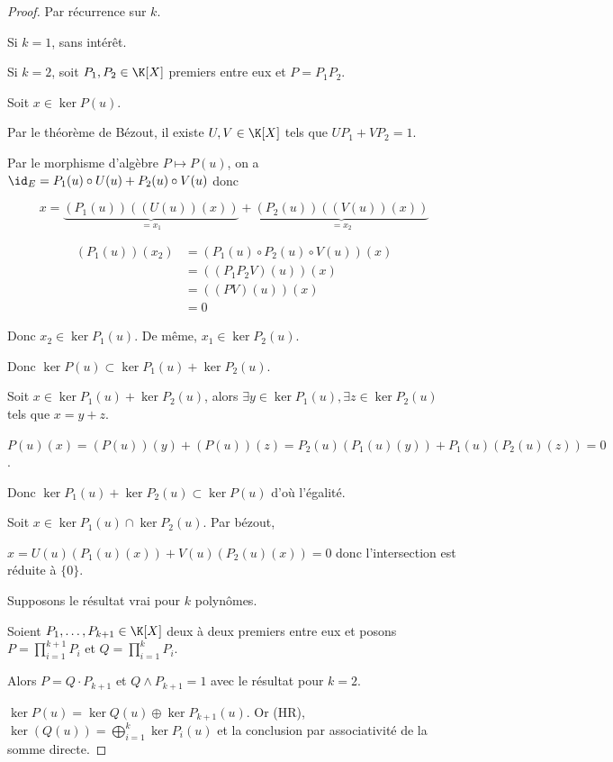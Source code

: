 
\begin{proof}
    Par récurrence sur $k$. 

    Si $k = 1$, sans intérêt. 

    Si $k = 2$, soit $P_1, P_2 \in \K[X]$ premiers entre eux et $P = P_1 P_2$.

    Soit $x \in \ker P(u)$. 

    Par le théorème de Bézout, il existe $U, V \in \K[X]$ tels que $U P_1 + V P_2 = 1$.

    Par le morphisme d'algèbre $P \mapsto P(u)$, on a 
    $\id_E = P_1(u) \circ U(u) + P_2(u) \circ V(u)$ donc 

    $$x = \underbrace{(P_1(u))((U(u))(x))}_{= x_1} + \underbrace{(P_2(u))((V(u))(x))}_{= x_2}$$

    \begin{align}
        (P_1(u))(x_2) & = (P_1(u) \circ P_2(u) \circ V(u))(x) \\
        & = ((P_1 P_2V)(u))(x) \\
        & = ((PV)(u))(x) \\
        & = 0
    \end{align}

    Donc $x_2 \in \ker P_1(u)$. De même, $x_1 \in \ker P_2(u)$.

    Donc $\ker P(u) \subset \ker P_1(u) + \ker P_2(u)$.


    \lvspace Soit $x \in \ker P_1(u) + \ker P_2(u)$, alors $\exists y \in \ker P_1 (u), 
    \exists z \in \ker P_2(u)$ tels que $x = y + z$.

    $P(u)(x) = (P(u))(y) + (P(u))(z) = P_2(u)(P_1(u)(y)) + P_1(u)(P_2(u)(z)) = 0$. 

    Donc $\ker P_1 (u) + \ker P_2(u) \subset \ker P(u)$ d'où l'égalité. 

    Soit $x \in \ker P_1(u) \cap \ker P_2(u)$. Par bézout, 

    $x = U(u)(P_1(u)(x)) + V(u)(P_2(u)(x)) = 0$ donc l'intersection est réduite à $\{0\}$.

     Supposons le résultat vrai pour $k$ polynômes. 

    Soient $P_1, \dots, P_{k + 1} \in \K[X]$ deux à deux premiers entre eux et posons 
    $P = \displaystyle \prod_{i = 1}^{ k + 1 } P_i$ et $Q = \displaystyle \prod_{i = 1 }^{ k } P_i$.

    Alors $P = Q \cdot P_{k + 1}$ et $Q \wedge P_{k + 1} = 1$ avec le résultat pour $k = 2$.

    $\ker P(u) = \ker Q(u) \oplus \ker P_{k + 1}(u)$. Or (HR), 
    $\ker(Q(u)) = \bigoplus_{i = 1 }^{ k } \ker P_i(u)$ et la conclusion par associativité de 
    la somme directe.
\end{proof}


